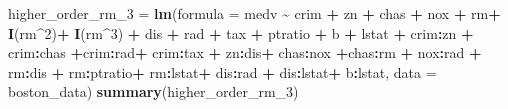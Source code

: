 \documentclass[
]{article}
\newenvironment{Shaded}{\begin{snugshade}}{\end{snugshade}}
\newcommand{\AttributeTok}[1]{\textcolor[rgb]{0.13,0.29,0.53}{#1}}
\newcommand{\DecValTok}[1]{\textcolor[rgb]{0.00,0.00,0.81}{#1}}
\newcommand{\FunctionTok}[1]{\textcolor[rgb]{0.13,0.29,0.53}{\textbf{#1}}}
\newcommand{\NormalTok}[1]{#1}
\newcommand{\OtherTok}[1]{\textcolor[rgb]{0.56,0.35,0.01}{#1}}
\newcommand{\SpecialCharTok}[1]{\textcolor[rgb]{0.81,0.36,0.00}{\textbf{#1}}}
\begin{document}
\begin{Shaded}
\begin{Highlighting}[]
\NormalTok{higher\_order\_rm\_3 }\OtherTok{=} \FunctionTok{lm}\NormalTok{(}\AttributeTok{formula =}\NormalTok{ medv }\SpecialCharTok{\textasciitilde{}}\NormalTok{ crim }\SpecialCharTok{+}\NormalTok{ zn }\SpecialCharTok{+}\NormalTok{ chas }\SpecialCharTok{+}\NormalTok{ nox }\SpecialCharTok{+}\NormalTok{ rm}\SpecialCharTok{+} \FunctionTok{I}\NormalTok{(rm}\SpecialCharTok{\^{}}\DecValTok{2}\NormalTok{)}\SpecialCharTok{+} \FunctionTok{I}\NormalTok{(rm}\SpecialCharTok{\^{}}\DecValTok{3}\NormalTok{) }\SpecialCharTok{+}\NormalTok{ dis }\SpecialCharTok{+}\NormalTok{ rad }\SpecialCharTok{+}\NormalTok{ tax }\SpecialCharTok{+}\NormalTok{ ptratio }\SpecialCharTok{+}\NormalTok{ b }\SpecialCharTok{+}\NormalTok{ lstat }\SpecialCharTok{+}\NormalTok{ crim}\SpecialCharTok{:}\NormalTok{zn }\SpecialCharTok{+}\NormalTok{ crim}\SpecialCharTok{:}\NormalTok{chas  }\SpecialCharTok{+}\NormalTok{crim}\SpecialCharTok{:}\NormalTok{rad}\SpecialCharTok{+}\NormalTok{ crim}\SpecialCharTok{:}\NormalTok{tax }\SpecialCharTok{+}\NormalTok{ zn}\SpecialCharTok{:}\NormalTok{dis}\SpecialCharTok{+}\NormalTok{ chas}\SpecialCharTok{:}\NormalTok{nox }\SpecialCharTok{+}\NormalTok{chas}\SpecialCharTok{:}\NormalTok{rm }\SpecialCharTok{+}\NormalTok{ nox}\SpecialCharTok{:}\NormalTok{rad }\SpecialCharTok{+}\NormalTok{ rm}\SpecialCharTok{:}\NormalTok{dis }\SpecialCharTok{+}\NormalTok{ rm}\SpecialCharTok{:}\NormalTok{ptratio}\SpecialCharTok{+}\NormalTok{ rm}\SpecialCharTok{:}\NormalTok{lstat}\SpecialCharTok{+}\NormalTok{ dis}\SpecialCharTok{:}\NormalTok{rad }\SpecialCharTok{+}\NormalTok{ dis}\SpecialCharTok{:}\NormalTok{lstat}\SpecialCharTok{+}\NormalTok{ b}\SpecialCharTok{:}\NormalTok{lstat, }\AttributeTok{data =}\NormalTok{ boston\_data)}
\FunctionTok{summary}\NormalTok{(higher\_order\_rm\_3)}
\end{Highlighting}
\end{Shaded}
\end{document}
